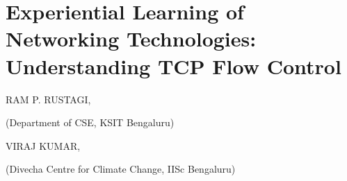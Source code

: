 \chapter{Experiential Learning of Networking Technologies: Understanding TCP Flow Control}

\begin{center}
{\large\uppercase{Ram P. Rustagi}}, 

(Department of CSE, KSIT Bengaluru) 

\vskip -6pt

\bigskip
{\large\uppercase{Viraj Kumar,}} 

(Divecha Centre for Climate Change, IISc Bengaluru)

\end{center}

\noindent{}
\newpage

